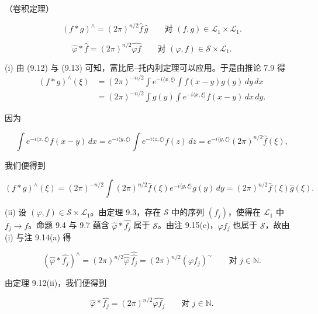 \begin{theorem}

（卷积定理）

\begin{subitems}
\item

\[ (f*g)^{\wedge} = (2\pi)^{n/2}\widehat{f}\,\widehat{g} \qquad \text{对 } (f,g) \in \mathcal{L}_1\times\mathcal{L}_1 . \]

\item

\[ \widehat{\varphi}*\widehat{f} = (2\pi)^{n/2}\widehat{\varphi f} \qquad \text{对 } (\varphi,f) \in \mathcal{S}\times\mathcal{L}_1 . \]

\proofhead
(i) 由 (9.12) 与 (9.13) 可知，富比尼–托内利定理可以应用。于是由推论 7.9 得
\begin{equation*}
\begin{aligned}
(f*g)^{\wedge}(\xi) &= (2\pi)^{-n/2}\int e^{-i\langle x,\xi\rangle}\int f(x-y)g(y)\,dy\,dx \\ &= (2\pi)^{-n/2}\int g(y)\int e^{-i\langle x,\xi\rangle}f(x-y)\,dx\,dy .
\end{aligned}
\end{equation*}

因为

\[
\int e^{-i\langle x,\xi\rangle}f(x-y)\,dx = e^{-i\langle y,\xi\rangle}\int e^{-i\langle z,\xi\rangle}f(z)\,dz = e^{-i\langle y,\xi\rangle}(2\pi)^{n/2}\widehat{f}(\xi) ,
\]

我们便得到

\[
(f*g)^{\wedge}(\xi) = (2\pi)^{-n/2}\int(2\pi)^{n/2}\widehat{f}(\xi)e^{-i\langle y,\xi\rangle}g(y)\,dy = (2\pi)^{n/2}\widehat{f}(\xi)\widehat{g}(\xi) .
\]
\end{subitems}

(ii) 设 $ (\varphi,f) \in \mathcal{S}\times\mathcal{L}_1 $。由定理 9.3，存在 $ \mathcal{S} $ 中的序列 $ (f_j) $，使得在 $ \mathcal{L}_1 $ 中 $ f_j \to f $。命题 9.4 与 9.7 蕴含 $ \widehat{\varphi}*\widehat{f_j} $ 属于 $ \mathcal{S} $。由注 9.15(c)，$ \varphi f_j $ 也属于 $ \mathcal{S} $，故由 (i) 与注 9.14(a) 得

\[
(\widehat{\varphi}*\widehat{f_j})^{\wedge} = (2\pi)^{n/2}\widehat{\widehat{\varphi}}\,\widehat{\widehat{f_j}} = (2\pi)^{n/2}(\varphi f_j)^{\sim} \qquad \text{对 } j \in \mathbb{N} .
\]

由定理 9.12(ii)，我们便得到

\begin{equation}
\widehat{\varphi}*\widehat{f_j} = (2\pi)^{n/2}\widehat{\varphi f_j} \qquad \text{对 } j \in \mathbb{N} .\tag{9.14}
\end{equation}


\end{theorem}
